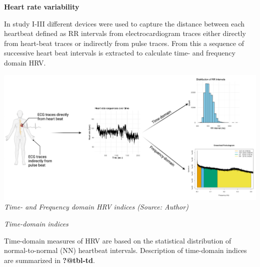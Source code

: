 \documentclass[
  letterpaper,
  headsepline=true,
  open=any]{scrbook}
\begin{document}
\textbf{Heart rate variability}

In study I-III different devices were used to capture the distance
between each heartbeat defined as RR intervals from electrocardiogram
traces either directly from heart-beat traces or indirectly from pulse
traces. From this a sequence of successive heart beat intervals is
extracted to calculate time- and frequency domain HRV.

\includegraphics{images/measurements_hrv.pdf} \emph{Time- and Frequency
domain HRV indices (Source: Author)}

\emph{Time-domain indices}

Time-domain measures of HRV are based on the statistical distribution of
normal-to-normal (NN) heartbeat intervals. Description of time-domain
indices are summarized in \textbf{?@tbl-td}.
\end{document}
